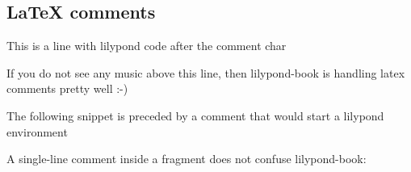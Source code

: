 \documentclass[a4paper, 12pt]{article}
\begin{document}
\subsection{LaTeX comments}
This is a line with lilypond code
after the comment char %

If you do not see any music above
this line, then lilypond-book is handling latex comments pretty well :-)

The following snippet is preceded by a comment that would start a lilypond
environment

{%
\parindent 0pt
\noindent
\ifx\preLilyPondExample \undefined
\else
  \expandafter\preLilyPondExample
\fi
\def\lilypondbook{}%

\ifx\postLilyPondExample \undefined
\else
  \expandafter\postLilyPondExample
\fi
}

A single-line comment inside a fragment does not confuse lilypond-book:

{%
\parindent 0pt
\noindent
\ifx\preLilyPondExample \undefined
\else
  \expandafter\preLilyPondExample
\fi
\def\lilypondbook{}%

\ifx\postLilyPondExample \undefined
\else
  \expandafter\postLilyPondExample
\fi
}
\end{document}
